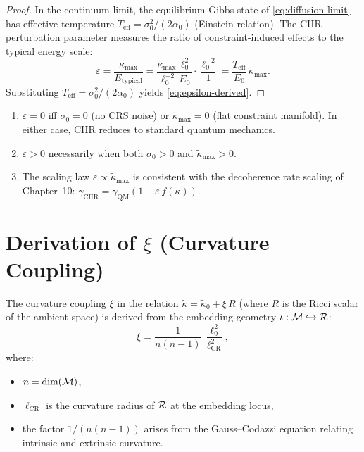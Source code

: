 \begin{proof}
In the continuum limit, the equilibrium Gibbs state of
\eqref{eq:diffusion-limit} has effective temperature
$T_{\mathrm{eff}} = \sigma_0^2 / (2\alpha_0)$ (Einstein relation).
The CIIR perturbation parameter measures the ratio of constraint-induced
effects to the typical energy scale:
\[
  \varepsilon = \frac{\kappa_{\max}}{E_{\mathrm{typical}}}
  = \frac{\kappa_{\max}\,\ell_0^2}{\ell_0^{-2}\,E_0}
  \cdot \frac{\ell_0^{-2}}{1}
  = \frac{T_{\mathrm{eff}}}{E_0}\,\tilde{\kappa}_{\max}.
\]
Substituting $T_{\mathrm{eff}} = \sigma_0^2/(2\alpha_0)$ yields
\eqref{eq:epsilon-derived}.
\end{proof}

\begin{corollary}\label{cor:12.2}
\begin{enumerate}
  \item $\varepsilon = 0$ iff $\sigma_0 = 0$ (no CRS noise) or
    $\tilde{\kappa}_{\max} = 0$ (flat constraint manifold).  In either
    case, CIIR reduces to standard quantum mechanics.
  \item $\varepsilon > 0$ necessarily when both $\sigma_0 > 0$ and
    $\tilde{\kappa}_{\max} > 0$.
  \item The scaling law $\varepsilon \propto \tilde{\kappa}_{\max}$
    is consistent with the decoherence rate scaling of Chapter~10:
    $\gamma_{\mathrm{CIIR}} = \gamma_{\mathrm{QM}}(1 + \varepsilon\,f(\kappa))$.
\end{enumerate}
\end{corollary}

\section{Derivation of \texorpdfstring{$\xi$}{xi}
  (Curvature Coupling)}
\label{sec:xi}

\begin{theorem}\label{thm:12.11}
The curvature coupling $\xi$ in the relation
$\tilde{\kappa} = \tilde{\kappa}_0 + \xi\,R$ (where $R$ is the
Ricci scalar of the ambient space) is derived from the embedding
geometry $\iota : \mathcal{M} \hookrightarrow \mathcal{R}$:
\begin{equation}\label{eq:xi-derived}
  \xi = \frac{1}{n(n-1)}\,\frac{\ell_0^2}{\ell_{\mathrm{CR}}^2},
\end{equation}
where:
\begin{itemize}
  \item $n = \dim(\mathcal{M})$,
  \item $\ell_{\mathrm{CR}}$ is the curvature radius of $\mathcal{R}$ at the
    embedding locus,
  \item the factor $1/(n(n-1))$ arises from the Gauss--Codazzi equation
    relating intrinsic and extrinsic curvature.
\end{itemize}
\end{theorem}

